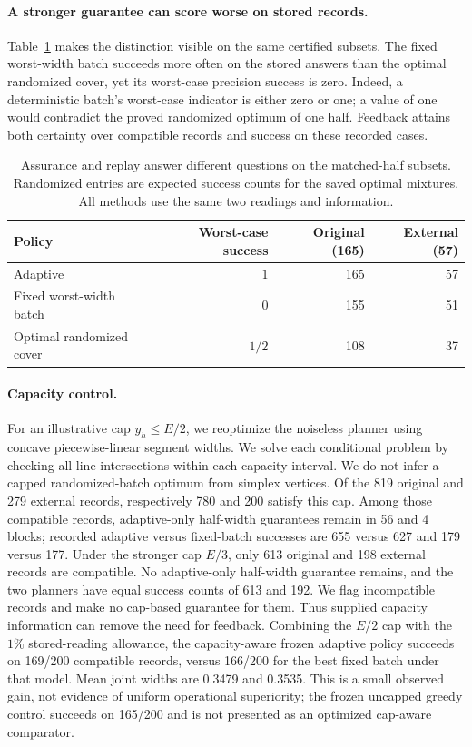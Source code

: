 \documentclass[12pt]{article}
\begin{document}
\paragraph{A stronger guarantee can score worse on stored records.}
Table~\ref{tab:guarantee-recorded-tradeoff} makes the distinction visible on
the same certified subsets. The fixed worst-width batch succeeds more often
on the stored answers than the optimal randomized cover, yet its worst-case
precision success is zero. Indeed, a deterministic batch's worst-case
indicator is either zero or one; a value of one would contradict the
proved randomized optimum of one half. Feedback attains both certainty
over compatible records and success on these recorded cases.

\begin{table}[htbp]\centering\small
\caption{Assurance and replay answer different questions on the matched-half
subsets. Randomized entries are expected success counts for the saved
optimal mixtures. All methods use the same two readings and information.}
\label{tab:guarantee-recorded-tradeoff}
\begin{tabular}{lrrr}\toprule
Policy & Worst-case success & Original (165) & External (57)\\\midrule
Adaptive & $1$ & 165 & 57\\
Fixed worst-width batch & $0$ & 155 & 51\\
Optimal randomized cover & $1/2$ & 108 & 37\\
\bottomrule\end{tabular}\end{table}

\paragraph{Capacity control.}
For an illustrative cap $y_h\leq E/2$, we reoptimize the noiseless planner
using concave piecewise-linear segment widths. We solve each conditional
problem by checking all line intersections within each capacity interval.
We do not infer a capped randomized-batch optimum from simplex vertices.
Of the 819 original and 279 external records, respectively 780 and 200 satisfy
this cap. Among those compatible records, adaptive-only half-width guarantees
remain in 56 and 4 blocks; recorded adaptive versus fixed-batch successes
are 655 versus 627 and 179 versus 177. Under the stronger cap $E/3$, only
613 original and 198 external records are compatible. No adaptive-only
half-width guarantee remains, and the two planners have equal success counts
of 613 and 192. We flag incompatible records and make no cap-based guarantee
for them. Thus supplied capacity information can remove the need for feedback.
Combining the $E/2$ cap with the $1\%$ stored-reading allowance, the
capacity-aware frozen adaptive policy succeeds on 169/200 compatible records,
versus 166/200 for the best fixed batch under that model. Mean joint widths
are 0.3479 and 0.3535. This is a small observed gain, not evidence of uniform
operational superiority; the frozen uncapped greedy control succeeds on
165/200 and is not presented as an optimized cap-aware comparator.
\end{document}
